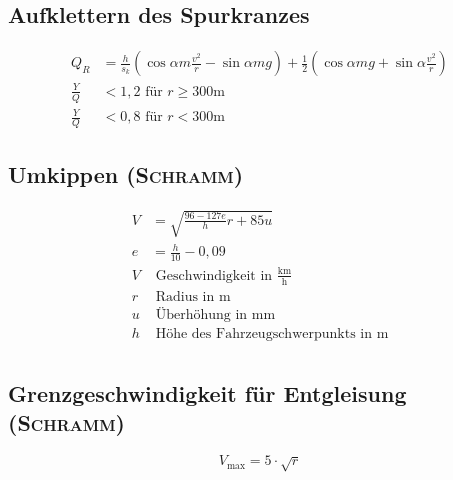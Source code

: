 \documentclass{scrartcl}
\begin{document}
	\subsection{Aufklettern des Spurkranzes}
	\begin{align*}
		Q_R &= \frac{h}{s_k} (\cos\alpha{}m\frac{v^2}{r}-\sin\alpha{}mg) + \frac{1}{2}(\cos\alpha{}mg + \sin\alpha{}\frac{v^2}{r}) \\
		\frac{Y}{Q} &< 1,2 \text{ für } r\geq300\mathrm{m} \\
		\frac{Y}{Q} &< 0,8 \text{ für } r<300\mathrm{m}
	\end{align*}

	\subsection{Umkippen (\textsc{Schramm})}
	\begin{align*}
		V &= \sqrt{\frac{96-127e}{h}r+85u} \\
		e &= \frac{h}{10}-0,09 \\
		V & \text{ Geschwindigkeit in }\frac{\mathrm{km}}{\mathrm{h}} \\
		r & \text{ Radius in } \mathrm{m} \\
		u & \text{ Überhöhung in } \mathrm{mm} \\
		h & \text{ Höhe des Fahrzeugschwerpunkts in } \mathrm{m}\\
	\end{align*}

	\subsection{Grenzgeschwindigkeit für Entgleisung (\textsc{Schramm})}
	$$ V_\mathrm{max} = 5\cdot\sqrt{r} $$
\end{document}
